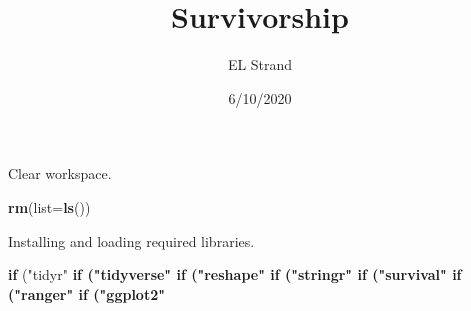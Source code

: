 \documentclass[]{article}
\title{Survivorship}
\author{EL Strand}
\date{6/10/2020}
\newenvironment{Shaded}{\begin{snugshade}}{\end{snugshade}}
\newcommand{\KeywordTok}[1]{\textcolor[rgb]{0.13,0.29,0.53}{\textbf{#1}}}
\newcommand{\DataTypeTok}[1]{\textcolor[rgb]{0.13,0.29,0.53}{#1}}
\newcommand{\StringTok}[1]{\textcolor[rgb]{0.31,0.60,0.02}{#1}}
\newcommand{\ControlFlowTok}[1]{\textcolor[rgb]{0.13,0.29,0.53}{\textbf{#1}}}
\newcommand{\OperatorTok}[1]{\textcolor[rgb]{0.81,0.36,0.00}{\textbf{#1}}}
\newcommand{\NormalTok}[1]{#1}
\begin{document}
\maketitle

Clear workspace.

\begin{Shaded}
\begin{Highlighting}[]
\KeywordTok{rm}\NormalTok{(}\DataTypeTok{list=}\KeywordTok{ls}\NormalTok{())}
\end{Highlighting}
\end{Shaded}

Installing and loading required libraries.

\begin{Shaded}
\begin{Highlighting}[]
\ControlFlowTok{if}\NormalTok{ (}\StringTok{"tidyr"} \OperatorTok{%in%}\StringTok{ }\KeywordTok{rownames}\NormalTok{(}\KeywordTok{installed.packages}\NormalTok{()) }\OperatorTok{==}\StringTok{ 'FALSE'}\NormalTok{) }\KeywordTok{install.packages}\NormalTok{(}\StringTok{'tidyr'}\NormalTok{) }
\ControlFlowTok{if}\NormalTok{ (}\StringTok{"tidyverse"} \OperatorTok{%in%}\StringTok{ }\KeywordTok{rownames}\NormalTok{(}\KeywordTok{installed.packages}\NormalTok{()) }\OperatorTok{==}\StringTok{ 'FALSE'}\NormalTok{) }\KeywordTok{install.packages}\NormalTok{(}\StringTok{'tidyverse'}\NormalTok{) }
\ControlFlowTok{if}\NormalTok{ (}\StringTok{"reshape"} \OperatorTok{%in%}\StringTok{ }\KeywordTok{rownames}\NormalTok{(}\KeywordTok{installed.packages}\NormalTok{()) }\OperatorTok{==}\StringTok{ 'FALSE'}\NormalTok{) }\KeywordTok{install.packages}\NormalTok{(}\StringTok{'reshape'}\NormalTok{) }
\ControlFlowTok{if}\NormalTok{ (}\StringTok{"stringr"} \OperatorTok{%in%}\StringTok{ }\KeywordTok{rownames}\NormalTok{(}\KeywordTok{installed.packages}\NormalTok{()) }\OperatorTok{==}\StringTok{ 'FALSE'}\NormalTok{) }\KeywordTok{install.packages}\NormalTok{(}\StringTok{'stringr'}\NormalTok{) }
\ControlFlowTok{if}\NormalTok{ (}\StringTok{"survival"} \OperatorTok{%in%}\StringTok{ }\KeywordTok{rownames}\NormalTok{(}\KeywordTok{installed.packages}\NormalTok{()) }\OperatorTok{==}\StringTok{ 'FALSE'}\NormalTok{) }\KeywordTok{install.packages}\NormalTok{(}\StringTok{'survival'}\NormalTok{) }
\ControlFlowTok{if}\NormalTok{ (}\StringTok{"ranger"} \OperatorTok{%in%}\StringTok{ }\KeywordTok{rownames}\NormalTok{(}\KeywordTok{installed.packages}\NormalTok{()) }\OperatorTok{==}\StringTok{ 'FALSE'}\NormalTok{) }\KeywordTok{install.packages}\NormalTok{(}\StringTok{'ranger'}\NormalTok{) }
\ControlFlowTok{if}\NormalTok{ (}\StringTok{"ggplot2"} \OperatorTok{%in%}\StringTok{ }\KeywordTok{rownames}\NormalTok{(}\KeywordTok{installed.packages}\NormalTok{()) }\OperatorTok{==}\StringTok{ 'FALSE'}\NormalTok{) }\KeywordTok{install.packages}\NormalTok{(}\StringTok{'ggplot2'}\NormalTok{) }
}}}}}}}
\end{Highlighting}
\end{Shaded}
\end{document}
